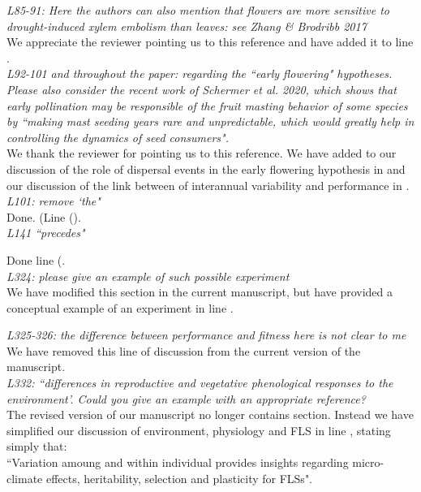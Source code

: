 \documentclass{article}[11pt]
\begin{document}
\emph{L85-91: Here the authors can also mention that flowers are more sensitive to drought-induced xylem embolism than leaves: see Zhang \& Brodribb 2017}\\

\noindent We appreciate the reviewer pointing us to this reference and have added it to line .\\

\emph{L92-101 and throughout the paper: regarding the ``early flowering" hypotheses. Please also consider the recent work of Schermer et al. 2020, which shows that early pollination may be responsible of the fruit masting behavior of some species by ``making mast seeding years rare and unpredictable, which would greatly help in controlling the dynamics of seed consumers".}\\

\noindent We thank the reviewer for pointing us to this reference. We have added to our discussion of the role of dispersal events in the early flowering hypothesis in  and our discussion of the link between of interannual variability and performance in .\\

\emph{L101: remove `the"}\\

Done. (Line ().\\

\emph{L141 ``precedes"}

Done line (.\\

\emph{L324: please give an example of such possible experiment}\\

\noindent We have modified this section in the current manuscript, but have provided a conceptual example of an experiment in line .

\emph{L325-326: the difference between performance and fitness here is not clear to me}\\

\noindent We have removed this line of discussion from the current version of the manuscript.\\

\emph{L332: ``differences in reproductive and vegetative phenological responses to the environment'. Could you give an example with an appropriate reference?}\\

\noindent The revised version of our manuscript no longer contains section. Instead we have simplified our discussion of environment, physiology and FLS in line , stating simply that:\\
\indent ``Variation amoung and within individual provides insights regarding  micro-climate effects, heritability, selection and plasticity for FLSs".\\
\end{document}

